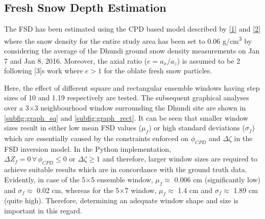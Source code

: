 \documentclass{article}
\begin{document}
\subsection{Fresh Snow Depth Estimation}
\label{ssec:fsde}
The FSD has been estimated using the CPD based model described by \eqref{1} and \eqref{2} where the snow density for the entire study area has been set to 0.06 g/cm\textsuperscript{3} by considering the average of the Dhundi ground snow density measurements on Jan 7 and Jan 8, 2016. Moreover, the axial ratio ($e=a_x/a_z$) is assumed to be 2 following [3]\textquotesingle s work where $e > 1$ for the oblate fresh snow particles.

Here, the effect of different square and rectangular ensemble windows having step sizes of 10 and 1.19 respectively are tested. The subsequent graphical analyses over a 3$\times$3 neighbourhood window surrounding the Dhundi site are shown in \ref{subfig:graph_sq} and \ref{subfig:graph_rect}. It can be seen that smaller window sizes result in either low mean FSD values ($\mu_f$) or high standard deviations ($\sigma_f$) which are essentially caused by the constraints enforced on $\phi_{CPD}$ and $\Delta{\zeta}$ in the FSD inversion model. In the Python implementation, $\Delta{Z_f} = 0 \, \forall \, \phi_{CPD} \le 0 \text{ or } \Delta{\zeta} \ge 1$ and therefore, larger window sizes are required to achieve suitable results which are in concordance with the ground truth data. Evidently, in case of the 5$\times$5 ensemble window, $\mu_f \approx$ 0.006 cm (significantly low) and $\sigma_f \approx$ 0.02 cm, whereas for the 5$\times$7 window, $\mu_f \approx$ 1.4 cm and $\sigma_f \approx$ 1.89 cm (quite high). Therefore, determining an adequate window shape and size is important in this regard.
\end{document}

